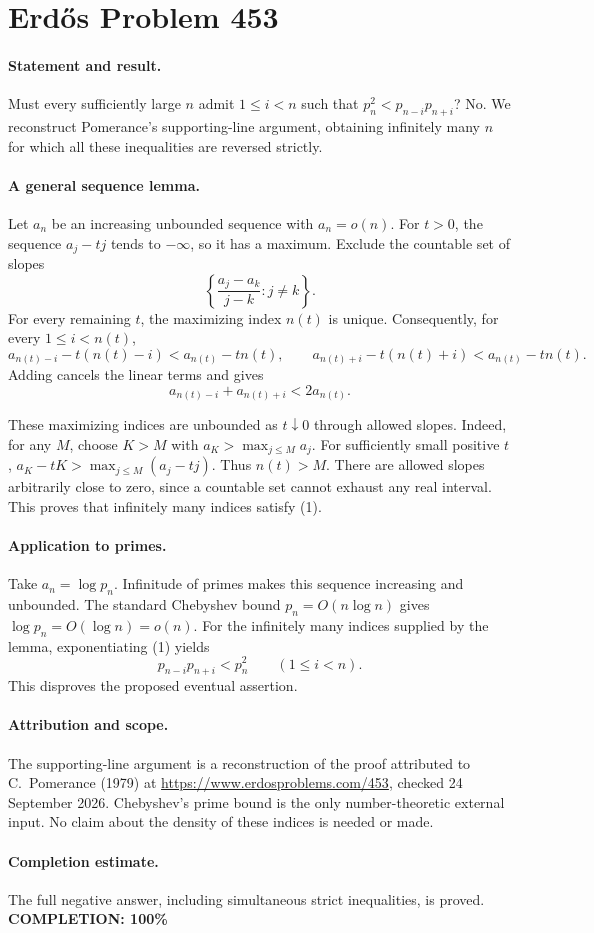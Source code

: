 \section*{Erd\H{o}s Problem 453}

\paragraph{Statement and result.}
Must every sufficiently large \(n\) admit \(1\leq i<n\) such that
\(p_n^2<p_{n-i}p_{n+i}\)? No. We reconstruct Pomerance's supporting-line
argument, obtaining infinitely many \(n\) for which all these inequalities
are reversed strictly.

\paragraph{A general sequence lemma.}
Let \(a_n\) be an increasing unbounded sequence with \(a_n=o(n)\).
For \(t>0\), the sequence \(a_j-tj\) tends to \(-\infty\), so it has
a maximum. Exclude the countable set of slopes
\[
 \left\{\frac{a_j-a_k}{j-k}:j\ne k\right\}.
\]
For every remaining \(t\), the maximizing index \(n(t)\) is unique.
Consequently, for every \(1\leq i<n(t)\),
\[
 a_{n(t)-i}-t(n(t)-i)<a_{n(t)}-tn(t),\qquad
 a_{n(t)+i}-t(n(t)+i)<a_{n(t)}-tn(t).
\]
Adding cancels the linear terms and gives
\[
 a_{n(t)-i}+a_{n(t)+i}<2a_{n(t)}.
 \tag{1}
\]

These maximizing indices are unbounded as \(t\downarrow0\) through
allowed slopes. Indeed, for any \(M\), choose \(K>M\) with
\(a_K>\max_{j\leq M}a_j\). For sufficiently small positive \(t\),
\(a_K-tK>\max_{j\leq M}(a_j-tj)\). Thus \(n(t)>M\).
There are allowed slopes arbitrarily close to zero, since a countable
set cannot exhaust any real interval. This proves that infinitely many
indices satisfy (1).

\paragraph{Application to primes.}
Take \(a_n=\log p_n\). Infinitude of primes makes this sequence
increasing and unbounded. The standard Chebyshev bound
\(p_n=O(n\log n)\) gives \(\log p_n=O(\log n)=o(n)\).
For the infinitely many indices supplied by the lemma, exponentiating
(1) yields
\[
 p_{n-i}p_{n+i}<p_n^2\qquad(1\leq i<n).
\]
This disproves the proposed eventual assertion.

\paragraph{Attribution and scope.}
The supporting-line argument is a reconstruction of the proof attributed
to C.~Pomerance (1979) at \url{https://www.erdosproblems.com/453},
checked 24 September 2026. Chebyshev's prime bound is the only
number-theoretic external input. No claim about the density of these
indices is needed or made.

\paragraph{Completion estimate.}
The full negative answer, including simultaneous strict inequalities, is proved.
\textbf{COMPLETION: 100\%}
